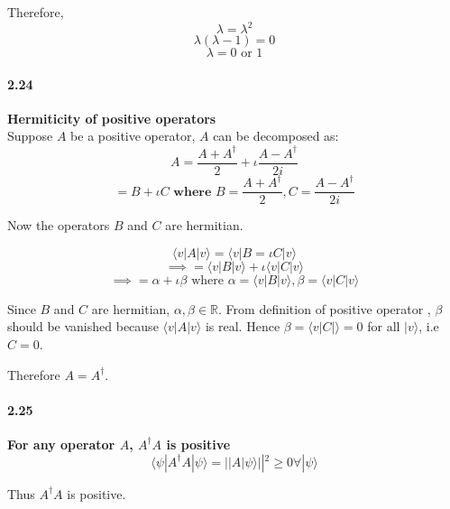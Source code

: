 Therefore,
$$ \lambda = \lambda^2$$
$$ \lambda(\lambda-1) = 0$$
$$\lambda = 0 \text{ or } 1$$

\paragraph{2.24} \textbf{Hermiticity of positive operators}%
\\
Suppose $A$ be a positive operator, $A$ can be decomposed as:
$$ A = \frac{A + A^{\dagger}}{2} + \iota \frac{A - A^{\dagger}}{2i}$$
$$ = B + \iota C \textbf{ where } B = \frac{A + A^{\dagger}}{2}, C = \frac{A - A^{\dagger}}{2i}$$

Now the operators $B$ and $C$ are hermitian.

$$ \langle v | A | v\rangle = \langle v |B = \iota C| v \rangle$$
$$ \implies = \langle v |B | v \rangle + \iota \langle v |C|v\rangle$$
$$ \implies = \alpha + \iota \beta \text{ where } \alpha = \langle v |B | v\rangle, \beta = \langle v | C | v\rangle$$

Since $B$ and $C$ are hermitian, $\alpha, \beta \in \mathbb{R}$. From definition of positive operator , $\beta$ should be vanished because $\langle v | A | v\rangle $ is real. Hence $\beta = \langle v |C|\rangle = 0$ for all $|v\rangle$, i.e $C=0$.

Therefore $A = A^{\dagger}$.


\paragraph{2.25} \textbf{For any operator $A$, $A^{\dagger}A$ is positive}%
\\

$$\langle \psi | A^{\dagger } A |\psi\rangle = || A |\psi\rangle ||^2 \ge 0 \forall |\psi\rangle$$

Thus $A^{\dagger} A $ is positive.
